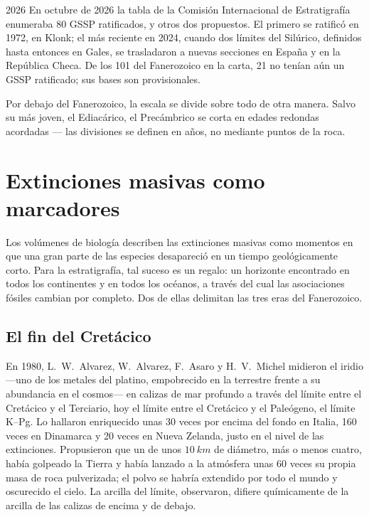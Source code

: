 \begin{dated}{2026}
En octubre de 2026 la tabla de la Comisión Internacional de Estratigrafía enumeraba 80 GSSP ratificados, y otros dos propuestos. El primero se ratificó en 1972, en Klonk; el más reciente en 2024, cuando dos límites del Silúrico, definidos hasta entonces en Gales, se trasladaron a nuevas secciones en España y en la República Checa. De los 101  del Fanerozoico en la carta, 21 no tenían aún un GSSP ratificado; sus bases son provisionales.
\end{dated}

Por debajo del Fanerozoico, la escala se divide sobre todo de otra manera. Salvo su  más joven, el Ediacárico, el Precámbrico se corta en edades redondas acordadas --- las divisiones se definen en años, no mediante puntos de la roca.

\section{Extinciones masivas como marcadores}\label{sec:b1:stratigraphic-scale:extinctions}

Los volúmenes de biología describen las extinciones masivas como momentos en que una gran parte de las especies desapareció en un tiempo geológicamente corto. Para la estratigrafía, tal suceso es un regalo: un horizonte encontrado en todos los continentes y en todos los océanos, a través del cual las asociaciones fósiles cambian por completo. Dos de ellas delimitan las tres eras del Fanerozoico.

\subsection*{El fin del Cretácico}

En 1980, L.~W.~Alvarez, W.~Alvarez, F.~Asaro y H.~V.~Michel midieron el iridio ---uno de los metales del platino, empobrecido en la  terrestre frente a su abundancia en el cosmos--- en calizas de mar profundo a través del límite entre el Cretácico y el Terciario, hoy el límite entre el Cretácico y el Paleógeno, el límite K--Pg. Lo hallaron enriquecido unas 30 veces por encima del fondo en Italia, 160 veces en Dinamarca y 20 veces en Nueva Zelanda, justo en el nivel de las extinciones. Propusieron que un  de unos $\qty{10}{km}$ de diámetro, más o menos cuatro, había golpeado la Tierra y había lanzado a la atmósfera unas 60 veces su propia masa de roca pulverizada; el polvo se habría extendido por todo el mundo y oscurecido el cielo. La arcilla del límite, observaron, difiere químicamente de la arcilla de las calizas de encima y de debajo.


